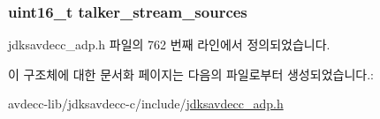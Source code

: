 \subsubsection[{\texorpdfstring{talker\+\_\+stream\+\_\+sources}{talker_stream_sources}}]{\setlength{\rightskip}{0pt plus 5cm}uint16\+\_\+t talker\+\_\+stream\+\_\+sources}\hypertarget{structjdksavdecc__adpdu_a9bd7d7b8ebd60d782a8b2be740355a37}{}\label{structjdksavdecc__adpdu_a9bd7d7b8ebd60d782a8b2be740355a37}


jdksavdecc\+\_\+adp.\+h 파일의 762 번째 라인에서 정의되었습니다.



이 구조체에 대한 문서화 페이지는 다음의 파일로부터 생성되었습니다.\+:\begin{DoxyCompactItemize}
\item 
avdecc-\/lib/jdksavdecc-\/c/include/\hyperlink{jdksavdecc__adp_8h}{jdksavdecc\+\_\+adp.\+h}\end{DoxyCompactItemize}
